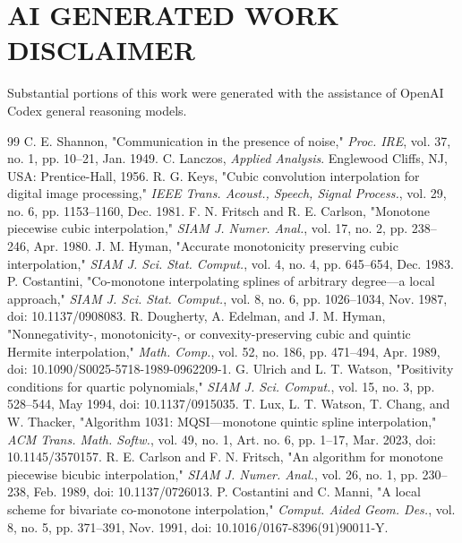 \documentclass[journal]{IEEEtran}
\begin{document}
\section*{AI GENERATED WORK DISCLAIMER}

Substantial portions of this work were generated with the assistance of
OpenAI Codex general reasoning models.

\begin{thebibliography}{99}
\scriptsize
{}
C. E. Shannon, "Communication in the presence of noise," \emph{Proc. IRE},
vol. 37, no. 1, pp. 10--21, Jan. 1949.
C. Lanczos, \emph{Applied Analysis}. Englewood Cliffs, NJ, USA:
Prentice-Hall, 1956.
R. G. Keys, "Cubic convolution interpolation for digital image
processing," \emph{IEEE Trans. Acoust., Speech, Signal Process.}, vol. 29,
no. 6, pp. 1153--1160, Dec. 1981.
F. N. Fritsch and R. E. Carlson, "Monotone piecewise cubic interpolation,"
\emph{SIAM J. Numer. Anal.}, vol. 17, no. 2, pp. 238--246, Apr. 1980.
J. M. Hyman, "Accurate monotonicity preserving cubic interpolation,"
\emph{SIAM J. Sci. Stat. Comput.}, vol. 4, no. 4, pp. 645--654, Dec. 1983.
P. Costantini, "Co-monotone interpolating splines of arbitrary degree---a
local approach," \emph{SIAM J. Sci. Stat. Comput.}, vol. 8, no. 6,
pp. 1026--1034, Nov. 1987, doi: 10.1137/0908083.
R. Dougherty, A. Edelman, and J. M. Hyman, "Nonnegativity-,
monotonicity-, or convexity-preserving cubic and quintic Hermite
interpolation," \emph{Math. Comp.}, vol. 52, no. 186, pp. 471--494,
Apr. 1989, doi: 10.1090/S0025-5718-1989-0962209-1.
G. Ulrich and L. T. Watson, "Positivity conditions for quartic
polynomials," \emph{SIAM J. Sci. Comput.}, vol. 15, no. 3, pp. 528--544,
May 1994, doi: 10.1137/0915035.
T. Lux, L. T. Watson, T. Chang, and W. Thacker, "Algorithm 1031:
MQSI---monotone quintic spline interpolation," \emph{ACM Trans. Math.
Softw.}, vol. 49, no. 1, Art. no. 6, pp. 1--17, Mar. 2023,
doi: 10.1145/3570157.
R. E. Carlson and F. N. Fritsch, "An algorithm for monotone piecewise
bicubic interpolation," \emph{SIAM J. Numer. Anal.}, vol. 26, no. 1,
pp. 230--238, Feb. 1989, doi: 10.1137/0726013.
P. Costantini and C. Manni, "A local scheme for bivariate co-monotone
interpolation," \emph{Comput. Aided Geom. Des.}, vol. 8, no. 5,
pp. 371--391, Nov. 1991, doi: 10.1016/0167-8396(91)90011-Y.

\end{thebibliography}
\end{document}
